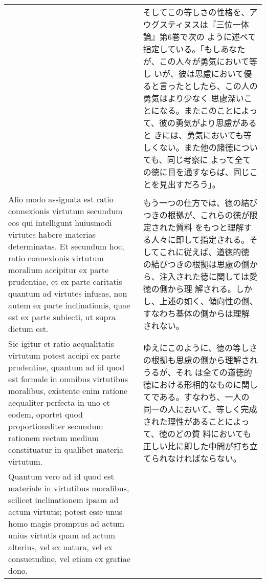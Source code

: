 \documentclass[10pt]{jsarticle}
\begin{document}
\begin{longtable}{p{21em}p{21em}}
 &

 そしてこの等しさの性格を、アウグスティヌスは『三位一体論』第6巻で次の
 ように述べて指定している。「もしあなたが、この人々が勇気において等し
 いが、彼は思慮において優ると言ったとしたら、この人の勇気はより少なく
 思慮深いことになる。またこのことによって、彼の勇気がより思慮があると
 きには、勇気においても等しくない。また他の諸徳についても、同じ考察に
 よって全ての徳に目を通すならば、同じことを見出すだろう」。

 \\
 

 Alio modo assignata est ratio connexionis virtutum secundum eos qui
 intelligunt huiusmodi virtutes habere materias determinatas. Et
 secundum hoc, ratio connexionis virtutum moralium accipitur ex parte
 prudentiae, et ex parte caritatis quantum ad virtutes infusas, non
 autem ex parte inclinationis, quae est ex parte subiecti, ut supra
 dictum est.




&

 もう一つの仕方では、徳の結びつきの根拠が、これらの徳が限定された質料
 をもつと理解する人々に即して指定される。そしてこれに従えば、道徳的徳
 の結びつきの根拠は思慮の側から、注入された徳に関しては愛徳の側から理
 解される。しかし、上述の如く、傾向性の側、すなわち基体の側からは理解
 されない。

\\

 Sic igitur et ratio aequalitatis virtutum potest accipi
 ex parte prudentiae, quantum ad id quod est formale in omnibus
 virtutibus moralibus, existente enim ratione aequaliter perfecta in
 uno et eodem, oportet quod proportionaliter secundum rationem rectam
 medium constituatur in qualibet materia virtutum.

&

 ゆえにこのように、徳の等しさの根拠も思慮の側から理解されうるが、それ
 は全ての道徳的徳における形相的なものに関してである。すなわち、一人の
 同一の人において、等しく完成された理性があることによって、徳のどの質
 料においても正しい比に即した中間が打ち立てられなければならない。

\\



 Quantum vero ad id quod est materiale in virtutibus moralibus,
 scilicet inclinationem ipsam ad actum virtutis; potest esse unus homo
 magis promptus ad actum unius virtutis quam ad actum alterius, vel ex
 natura, vel ex consuetudine, vel etiam ex gratiae dono.


\end{longtable}
\end{document}
